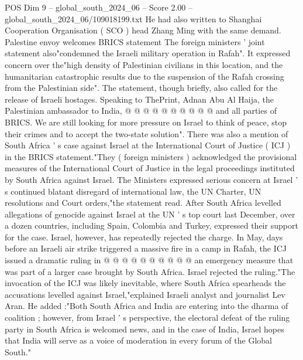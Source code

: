 \begin{textsample}{POS Dim 9 – global\_south\_2024\_06 – Score 2.00 – global\_south\_2024\_06/109018199.txt}
He had also written to Shanghai Cooperation Organisation ( SCO ) head Zhang Ming with the same demand.
Palestine envoy welcomes BRICS statement The foreign ministers ' joint statement also"condemned the Israeli military operation in Rafah".
It expressed concern over the"high density of Palestinian civilians in this location, and the humanitarian catastrophic results due to the suspension of the Rafah crossing from the Palestinian side".
The statement, though briefly, also called for the release of Israeli hostages.
Speaking to ThePrint, Adnan Abu Al Haija, the Palestinian ambassador to India, @ @ @ @ @ @ @ @ @ @ and all parties of BRICS.
We are still looking for more pressure on Israel to think of peace, stop their crimes and to accept the two-state solution".
There was also a mention of South Africa ' s case against Israel at the International Court of Justice ( ICJ ) in the BRICS statement."They ( foreign ministers ) acknowledged the provisional measures of the International Court of Justice in the legal proceedings instituted by South Africa against Israel.
The Ministers expressed serious concern at Israel ' s continued blatant disregard of international law, the UN Charter, UN resolutions and Court orders,"the statement read.
After South Africa levelled allegations of genocide against Israel at the UN ' s top court last December, over a dozen countries, including Spain, Colombia and Turkey, expressed their support for the case.
Israel, however, has repeatedly rejected the charge.
In May, days before an Israeli air strike triggered a massive fire in a camp in Rafah, the ICJ issued a dramatic ruling in @ @ @ @ @ @ @ @ @ @ an emergency measure that was part of a larger case brought by South Africa.
Israel rejected the ruling."The invocation of the ICJ was likely inevitable, where South Africa spearheads the accusations levelled against Israel,"explained Israeli analyst and journalist Lev Aran.
He added :"Both South Africa and India are entering into the dharma of coalition ; however, from Israel ' s perspective, the electoral defeat of the ruling party in South Africa is welcomed news, and in the case of India, Israel hopes that India will serve as a voice of moderation in every forum of the Global South."

\end{textsample}
